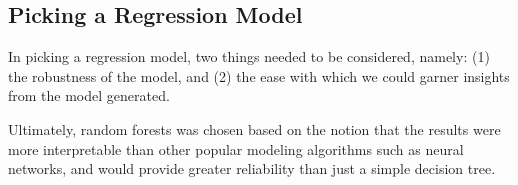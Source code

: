 



\subsection{Picking a Regression Model} %
\label{sub:picking_a_regression_model}

In picking a regression model, two things needed to be considered, namely: (1)
the robustness of the model, and (2) the ease with which we could garner
insights from the model generated.

Ultimately, random forests \cite{598994} was chosen based on the notion that the
results were more interpretable than other popular modeling algorithms such as
neural networks, and would provide greater reliability than just a simple
decision tree.

